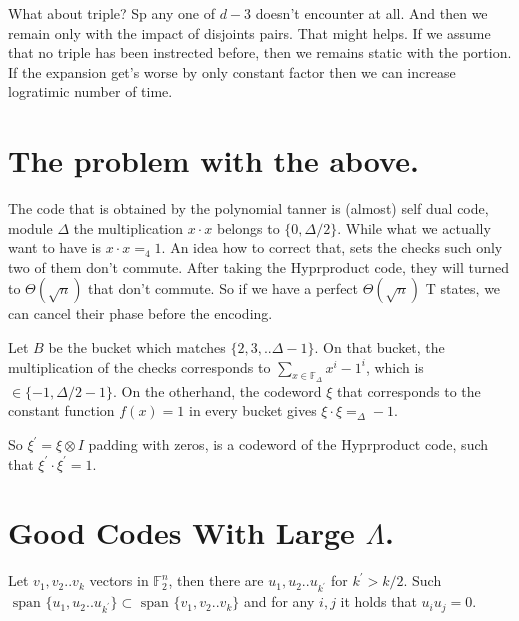 What about triple? Sp any one of $d-3$ doesn't encounter at all. And then we
remain only with the impact of disjoints pairs. That might helps. If we assume
that no triple has been instrected before, then we remains static with the
portion. If the expansion get's worse by only constant factor then we can
increase logratimic number of time.

\section{The problem with the above.}
The code that is obtained by the polynomial tanner is (almost) self dual code,
module $\Delta$ the multiplication $x \cdot x$ belongs to $\{ 0, \Delta/2 \}$.
While what we actually want to have is $x \cdot x =_{4} 1$. An idea how to
correct that, sets the checks such only two of them don't commute. After
taking the Hyprproduct code, they will turned to $\Theta(\sqrt{n})$ that don't
commute. So if we have a perfect $\Theta(\sqrt{n})$ T states, we can cancel
their phase before the encoding.

Let $B$ be the bucket which matches $\{2,3,..\Delta-1\}$. On that bucket, the
multiplication of the checks corresponds to $\sum_{x\in
\mathbb{F}_{\Delta}}x^{i} - 1^i$, which is $\in \{ -1, \Delta/2 - 1 \}$. On
the otherhand, the codeword $\xi$ that corresponds to the constant function
$f(x)= 1$ in every bucket gives $\xi \cdot \xi =_{\Delta} -1$.

So $\xi^{\prime} = \xi \otimes I$ padding with zeros, is a codeword of the
Hyprproduct code, such that $\xi^{\prime}\cdot \xi^{\prime} = 1$.

\section{Good Codes With Large $\Lambda$.}
\newcommand*{\DETAILS}{}
\ifdefined\DETAILS

\fi

\begin{claim}
  \label{claim:find}
  Let $v_{1},v_{2}..v_{k}$ vectors in $\mathbb{F}_{2}^{n}$, then there are
  $u_{1},u_{2}..u_{k^{\prime}}$ for $k^{\prime} > k/2$. Such $\text{ span } \{
  u_{1},u_{2}..u_{k^{\prime}} \} \subset \text{ span } \{ v_{1},v_{2}..v_{k} \}$
  and for any $i,j$ it holds that $u_{i}u_{j} = 0$.
\end{claim}

